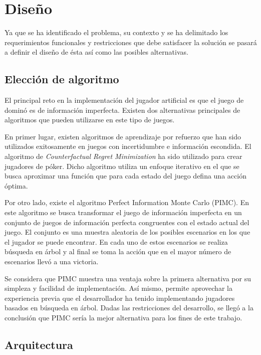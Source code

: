 \chapter{Diseño}

\noindent

Ya que se ha identificado el problema, su contexto y se ha delimitado los
requerimientos funcionales y restricciones que debe satisfacer la solución se
pasará a definir el diseño de ésta así como las posibles alternativas.

\section{Elección de algoritmo}

El principal reto en la implementación del jugador artificial es que el juego de
dominó es de información imperfecta. Existen dos alternativas principales de
algoritmos que pueden utilizarse en este tipo de juegos.

En primer lugar, existen algoritmos de aprendizaje por refuerzo que han sido
utilizados exitosamente en juegos con incertidumbre e información escondida. El
algoritmo de \textit{Counterfactual Regret Minimization} ha sido utilizado para
crear jugadores de póker. Dicho algoritmo utiliza un enfoque iterativo en el que
se busca aproximar una función que para cada estado del juego defina una acción
óptima.

Por otro lado, existe el algoritmo Perfect Information Monte Carlo (PIMC). En
este algoritmo se busca transformar el juego de información imperfecta en un
conjunto de juegos de información perfecta congruentes con el estado actual del
juego. El conjunto es una muestra aleatoria de los posibles escenarios en los
que el jugador se puede encontrar. En cada uno de estos escenarios se realiza
búsqueda en árbol y al final se toma la acción que en el mayor número de
escenarios llevó a una victoria.

Se considera que PIMC muestra una ventaja sobre la primera alternativa por su
simpleza y facilidad de implementación. Así mismo, permite aprovechar la
experiencia previa que el desarrollador ha tenido implementando jugadores
basados en búsqueda en árbol. Dadas las restricciones del desarrollo, se llegó a
la conclusión que PIMC sería la mejor alternativa para los fines de este
trabajo.

\section{Arquitectura}


